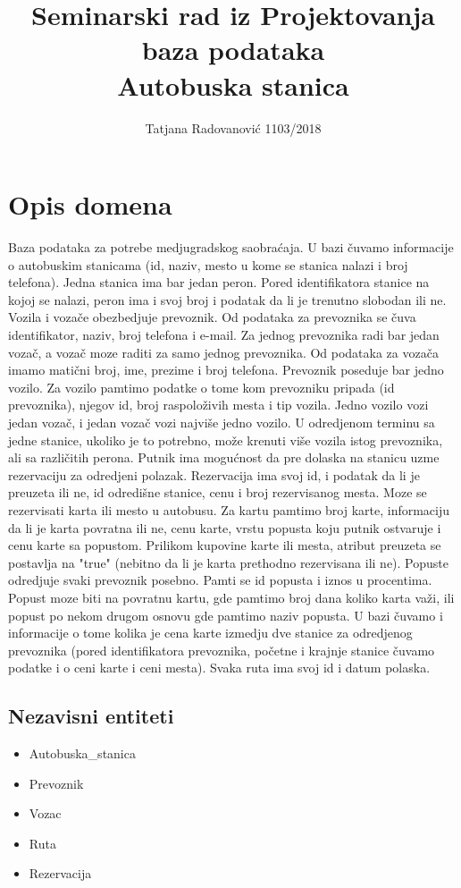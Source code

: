 \documentclass[12pt]{article}
\title{Seminarski rad iz Projektovanja baza podataka \\ Autobuska stanica}
\author{Tatjana Radovanovi\'c 1103/2018}
\begin{document}
\maketitle 

\newpage

\section{Opis domena}
Baza podataka za potrebe medjugradskog saobra\'caja. U bazi \v cuvamo informacije o autobuskim stanicama (id, naziv, mesto u kome se stanica nalazi i broj telefona). Jedna stanica ima bar jedan peron. Pored identifikatora stanice na kojoj se nalazi, peron ima i svoj broj i podatak da li je trenutno slobodan ili ne. Vozila i voza\v ce obezbedjuje prevoznik. Od podataka za prevoznika se \v cuva identifikator, naziv, broj telefona i e-mail. Za jednog prevoznika radi bar jedan voza\v c, a voza\v c moze raditi za samo jednog prevoznika. Od podataka za voza\v ca imamo mati\v cni broj, ime, prezime i broj telefona. Prevoznik poseduje bar jedno vozilo. Za vozilo pamtimo podatke o tome kom prevozniku pripada (id prevoznika), njegov id, broj raspolo\v zivih mesta i tip vozila. Jedno vozilo vozi jedan voza\v c, i jedan voza\v c vozi najvi\v se jedno vozilo. U odredjenom terminu sa jedne stanice, ukoliko je to potrebno, mo\v ze krenuti vi\v se vozila istog prevoznika, ali sa razli\v citih perona. Putnik ima mogu\'cnost da pre dolaska na stanicu uzme rezervaciju za odredjeni polazak. Rezervacija ima svoj id, i podatak da li je preuzeta ili ne, id odredi\v sne stanice, cenu i broj rezervisanog mesta. Moze se rezervisati karta ili mesto u autobusu. Za kartu pamtimo broj karte, informaciju da li je karta povratna ili ne, cenu karte, vrstu popusta koju putnik ostvaruje i cenu karte sa popustom. Prilikom kupovine karte ili mesta, atribut preuzeta se postavlja na "true" (nebitno da li je karta prethodno rezervisana ili ne). Popuste odredjuje svaki prevoznik posebno. Pamti se id popusta i iznos u procentima. Popust moze biti na povratnu kartu, gde pamtimo broj dana koliko karta va\v zi, ili popust po nekom drugom osnovu gde pamtimo naziv popusta. U bazi \v cuvamo i informacije o tome kolika je cena karte izmedju dve stanice za odredjenog prevoznika (pored identifikatora prevoznika, po\v cetne i krajnje stanice \v cuvamo podatke i o ceni karte i ceni mesta). 
Svaka ruta ima svoj id i datum polaska.

\subsection{Nezavisni entiteti}
\begin{itemize}
	\item Autobuska\_stanica
	\item Prevoznik
	\item Vozac
	\item Ruta
	\item Rezervacija
\end{itemize}
\end{document}
